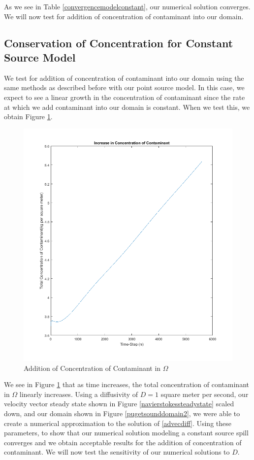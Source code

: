\documentclass[a4paper]{article}
\theoremstyle{remark}
\theoremstyle{remark}
\begin{document}
\noindent As we see in Table \ref{convergencemodelconstant}, our numerical solution converges. We will now test for addition of concentration of contaminant into our domain.

\subsection{Conservation of Concentration for Constant Source Model} \label{IncreaseConstantModelSection}
We test for addition of concentration of contaminant into our domain using the same methods as described before with our point source model. In this case, we expect to see a linear growth in the concentration of contaminant since the rate at which we add contaminant into our domain is constant. When we test this, we obtain Figure \ref{constantaddition}.

\begin{figure}[H]   
\centering   
   \includegraphics[trim=0mm 0mm 0mm 0mm,clip,width=0.5\linewidth]{constincrease.png}
    \caption{Addition of Concentration of Contaminant in $\Omega$}
    \label{constantaddition}
\end{figure}

We see in Figure \ref{constantaddition} that as time increases, the total concentration of contaminant in $\Omega$ linearly increases. Using a diffusivity of $D=1$ square meter per second, our velocity vector steady state shown in Figure \ref{navierstokessteadystate} scaled down, and our domain shown in Figure \ref{pugetsounddomain2}, we were able to create a numerical approximation to the solution of \eqref{advecdiff}. Using these parameters, to show that our numerical solution modeling a constant source spill converges and we obtain acceptable results for the addition of concentration of contaminant. We will now test the sensitivity of our numerical solutions to $D$.
\end{document}
